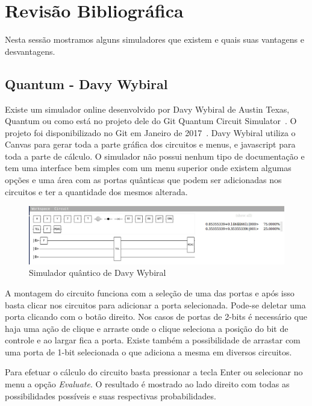 \documentclass[a4paper, 12pt, oneside]{book}
\begin{document}
\section{Revisão Bibliográfica}

Nesta sessão mostramos alguns simuladores que existem e quais suas vantagens e desvantagens.

\subsection{Quantum - Davy Wybiral}

Existe um simulador online desenvolvido por Davy Wybiral de Austin Texas, Quantum ou como está no projeto dele do Git Quantum Circuit Simulator~\cite{davyw}. O projeto foi disponibilizado no Git em Janeiro de 2017~\cite{gitdavyw}. Davy Wybiral utiliza o Canvas para gerar toda a parte gráfica dos circuitos e menus, e javascript para toda a parte de cálculo. O simulador não possui nenhum tipo de documentação e tem uma interface bem simples com um menu superior onde existem algumas opções e uma área com as portas quânticas que podem ser adicionadas nos circuitos e ter a quantidade dos mesmos alterada.

\begin{figure}[hbtp]
\centering
\includegraphics[scale=0.36]{davyw.jpg}
\caption{Simulador quântico de Davy Wybiral}
\end{figure}

A montagem do circuito funciona com a seleção de uma das portas e após isso basta clicar nos circuitos para adicionar a porta selecionada. Pode-se deletar uma porta clicando com o botão direito. Nos casos de portas de 2-bits é necessário que haja uma ação de clique e arraste onde o clique seleciona a posição do bit de controle e ao largar fica a porta. Existe também a possibilidade de arrastar com uma porta de 1-bit selecionada o que adiciona a mesma em diversos circuitos.

Para efetuar o cálculo do circuito basta pressionar a tecla Enter ou selecionar no menu a opção \textit{Evaluate}. O resultado é mostrado ao lado direito com todas as possibilidades possíveis e suas respectivas probabilidades.
\end{document}

